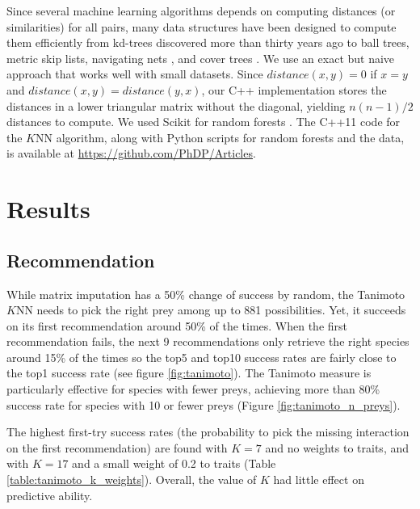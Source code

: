 \documentclass[letterpaper]{article}
\begin{document}
Since several machine learning algorithms depends on computing distances (or
similarities) for all pairs, many data structures have been designed to compute
them efficiently from kd-trees discovered more than thirty years ago
\cite{fri77} to ball trees, metric skip lists, navigating nets \cite{izb15},
and cover trees \cite{bey06,izb15}. We use an exact but naive approach that
works well with small datasets. Since $distance(x, y) = 0$ if $x = y$ and
$distance(x, y) = distance(y, x)$, our C++ implementation stores the distances
in a lower triangular matrix without the diagonal, yielding $n(n - 1)/2$
distances to compute. We used Scikit for random forests \cite{scikit-learn}.
The C++11 code for the $K$NN algorithm, along with Python scripts for random
forests and the data, is available at
\href{https://github.com/PhDP/Articles}{https://github.com/PhDP/Articles}.



\section{Results}

\subsection{Recommendation}

While matrix imputation has a 50\% change of success by random, the Tanimoto
$K$NN needs to pick the right prey among up to 881 possibilities. Yet, it
succeeds on its first recommendation around 50\% of the times. When the first
recommendation fails, the next 9 recommendations only retrieve the right
species around 15\% of the times so the top5 and top10 success rates are fairly
close to the top1 success rate (see figure \ref{fig:tanimoto}). The Tanimoto
measure is particularly effective for species with fewer preys, achieving more
than 80\% success rate for species with 10 or fewer preys (Figure
\ref{fig:tanimoto_n_preys}).

The highest first-try success rates (the probability to pick the missing
interaction on the first recommendation) are found with $K = 7$ and no weights
to traits, and with $K = 17$ and a small weight of 0.2 to traits (Table
\ref{table:tanimoto_k_weights}). Overall, the value of $K$ had little
effect on predictive ability.
\end{document}
